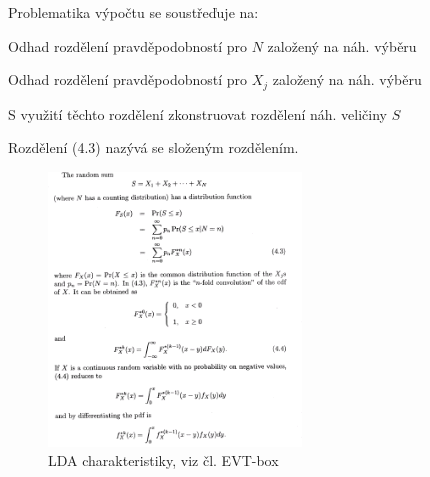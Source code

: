 \documentclass{article}
\begin{document}
Problematika výpočtu se soustřeďuje na:
\begin{compactitem}
\item Odhad rozdělení pravděpodobností pro $N$ založený na náh. výběru
\item Odhad rozdělení pravděpodobností pro $X_j$ založený na náh. výběru
\item S využití těchto rozdělení zkonstruovat rozdělení náh. veličiny $S$
\item Rozdělení (4.3) nazývá se složeným rozdělením.
\end{compactitem}


\begin{figure}[H]
  \caption{LDA charakteristiky, viz čl. EVT-box}
  \centering
    \includegraphics[width=0.6\textwidth]{ldachar}
\end{figure}






\end{document}
